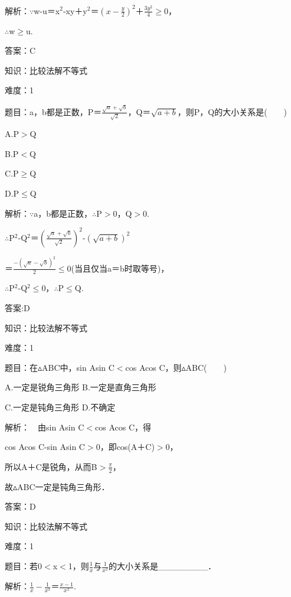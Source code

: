 \documentclass{article} %
\begin{document}
 解析：$\mathrm{\because}$w-u＝x${}^{2}$-xy＋y${}^{2}$＝$(x-\frac{y}{2})^2$＋$\frac{3y^2}{4}$$\mathrm{\ge}$0，

$\mathrm{\therefore}$w$\mathrm{\ge}$u.

 答案：C



 知识：比较法解不等式

 难度：1

 题目：a，b都是正数，P＝$\frac{\sqrt{a}+\sqrt{b}}{\sqrt{2}}$，Q＝$\sqrt{a+b}$，则P，Q的大小关系是(　　)

A.P$\mathrm{>}$Q  

B.P$\mathrm{<}$Q  

C.P$\mathrm{\ge}$Q  

D.P$\mathrm{\le}$Q

 解析：$\mathrm{\because}$a，b都是正数，$\mathrm{\therefore}$P$\mathrm{>}$0，Q$\mathrm{>}$0.

$\mathrm{\therefore}$P${}^{2}$-Q${}^{2}$＝$(\frac{\sqrt{a}+\sqrt{b}}{\sqrt{2}})^2$-$(\sqrt{a+b})^2$

＝$\frac{-(\sqrt{a}-\sqrt{b})^2}{2}$$\mathrm{\le}$0(当且仅当a＝b时取等号)，

$\mathrm{\therefore}$P${}^{2}$-Q${}^{2}$$\mathrm{\le}$0，$\mathrm{\therefore}$P$\mathrm{\le}$Q.

 答案:D



 知识：比较法解不等式

 难度：1

 题目：在$\mathrm{\vartriangle}$ABC中，sin Asin C$\mathrm{<}$cos Acos C，则$\mathrm{\vartriangle}$ABC(　　)

A.一定是锐角三角形  B.一定是直角三角形

C.一定是钝角三角形  D.不确定

 解析：　由sin Asin C$\mathrm{<}$cos Acos C，得

cos Acos C-sin Asin C$\mathrm{>}$0，即cos(A＋C)$\mathrm{>}$0，

所以A＋C是锐角，从而B$\mathrm{>}\frac{\pi}{2}$，

故$\mathrm{\vartriangle}$ABC一定是钝角三角形．

 答案：D



 知识：比较法解不等式

 难度：1

 题目：若0$\mathrm{<}$x$\mathrm{<}$1，则$\frac{1}{x}$与$\frac{1}{x^2}$的大小关系是\_\_\_\_\_\_\_\_．

 解析：$\frac{1}{x}-\frac{1}{x^2}$＝$\frac{x-1}{x^2}$.
\end{document}
